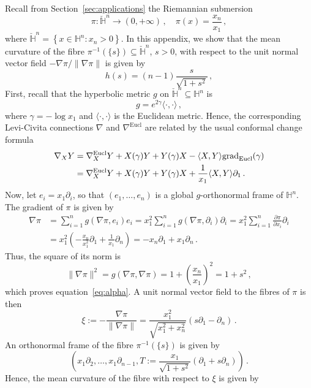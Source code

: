 \documentclass[oneside,12pt]{amsart}
\theoremstyle{definition}
\newcommand{\grad}{\mathrm{grad}}
\begin{document}
Recall from Section~\ref{sec:applications} the Riemannian submersion 
\[ 
\pi \colon \check{\mathbb{H}}^n \to (0, +\infty) \, , \quad \pi(x) = \frac{x_n}{x_1} \, , 
\] 
where $\check{\mathbb{H}}^n = \left\{ x \in \mathbb{H}^n \colon x_{n} > 0 \right\}$. In this appendix, we show that the mean curvature of the fibre $\pi^{-1 }(\{s\}) \subseteq \check{\mathbb{H}}^n$, $s>0$, with respect to the unit normal vector field $- \nabla \pi / \lVert \nabla \pi \rVert$ is given by
\[
         h(s) = (n-1) \frac{s}{\sqrt{1+s^2}} \, , 
\]
First, recall that the hyperbolic metric $g$ on $\check{\mathbb{H}}^n \subseteq \mathbb{H}^n$ is 
\[ 
g = e^{2 \gamma} \langle \cdot , \cdot\rangle \, , 
\]
where $\gamma = - \log{x_1}$ and $\langle \cdot , \cdot \rangle$ is the Euclidean metric. Hence, the corresponding Levi-Civita connections $\nabla$ and $\nabla^{\mathrm{Eucl}}$ are related by the usual conformal change formula 
\begin{align} \label{eq:LC_conformal}
\nabla_X Y &= \nabla^{\mathrm{Eucl}}_X Y + X(\gamma) Y + Y(\gamma) X - \langle X,Y \rangle \grad_{\mathrm{Eucl}} (\gamma) \notag \\
&= \nabla^{\mathrm{Eucl}}_X Y + X(\gamma) Y + Y(\gamma) X + \frac{1}{x_1} \langle X,Y \rangle \partial_{1} \, .
\end{align}
Now, let $e_i = x_1 \partial_i$, so that $(e_1 , \dots , e_n)$ is a global $g$-orthonormal frame of $\mathbb{H}^n$. The gradient of $\pi$ is given by  
\begin{align*}
\nabla \pi &= \sum_{i=1}^{n} g\left( \nabla \pi , e_i \right) e_i = x_1^2\sum_{i=1}^{n} g\left( \nabla \pi , \partial_i \right) \partial_i = x_1^2\sum_{i=1}^{n} \frac{\partial \pi}{\partial x_i} \partial_i \\
&= x_1^2 \left( -\frac{x_n}{x_1^2} \partial_1 + \frac{1}{x_1} \partial_n \right) = - x_n \partial_1 + x_1 \partial_n \, . 
\end{align*}
Thus, the square of its norm is 
\[
\lVert \nabla \pi \rVert^2 = g \left( \nabla \pi , \nabla \pi \right) = 1 + \left( \frac{x_n}{x_1} \right)^2 = 1+s^2 \, , 
\]
which proves equation~\eqref{eq:alpha}. A unit normal vector field to the fibres of $\pi$ is then 
\[ 
\xi := -\frac{\nabla \pi}{\lVert \nabla \pi \rVert} = \frac{x_1^2}{\sqrt{x_1^2 + x_n^2}} \left( s \partial_1 - \partial_n \right) \, . 
\]
An orthonormal frame of the fibre $\pi^{-1}(\{s\})$ is given by 
\[ 
\left( x_1 \partial_2 , \dots , x_1 \partial_{n-1} , T := \frac{x_1}{\sqrt{1+s^2}} \left( \partial_1 + s \partial_n \right) \right) \, . 
\]
Hence, the mean curvature of the fibre with respect to $\xi$ is given by 
\end{document}
